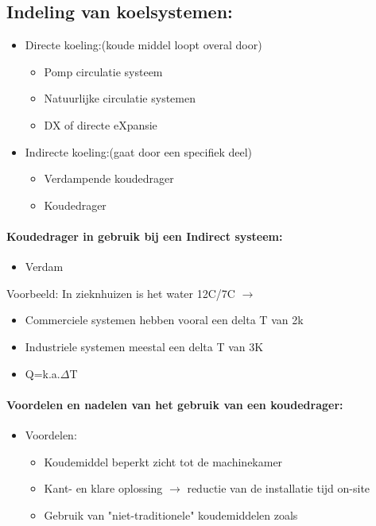 \documentclass[12pt]{article}
\begin{document}
\subsection{Indeling van koelsystemen:}
\begin{itemize}
    \item Directe koeling:(koude middel loopt overal door)\begin{itemize}
        \item Pomp circulatie systeem 
        \item Natuurlijke circulatie systemen 
        \item DX of directe eXpansie 
    \end{itemize}
    \item Indirecte koeling:(gaat door een specifiek deel)\begin{itemize}
        \item Verdampende koudedrager 
        \item Koudedrager
    \end{itemize}
\end{itemize}
\paragraph{Koudedrager in gebruik bij een Indirect systeem:}
\begin{itemize}
    \item Verdam
\end{itemize}
Voorbeeld: In zieknhuizen is het water 12C/7C $\rightarrow$
\begin{itemize}
    \item Commerciele systemen hebben vooral een delta T van 2k 
    \item Industriele systemen meestal een delta T van 3K 
    \item Q=k.a.$\Delta$T 
\end{itemize}
\paragraph{Voordelen en nadelen van het gebruik van een koudedrager:}
\begin{itemize}
    \item Voordelen:\begin{itemize}
        \item Koudemiddel beperkt zicht tot de machinekamer 
        \item Kant- en klare oplossing $\rightarrow$ reductie van de installatie tijd on-site 
        \item Gebruik van "niet-traditionele" koudemiddelen zoals 
    \end{itemize}
\end{itemize}
\end{document}
